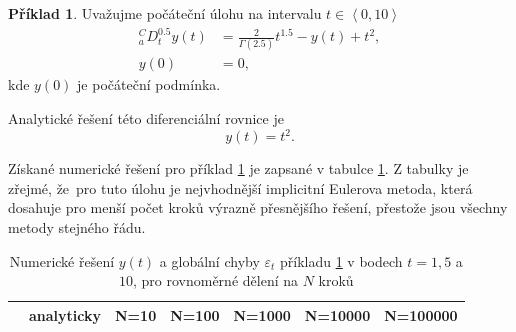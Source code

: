 \documentclass[a4paper,12pt,twoside]{article}
\theoremstyle{definition}
\newtheorem{prikl}[veta]{Příklad}
\theoremstyle{remark}
\numberwithin{equation}{section}
\numberwithin{table}{section}
\numberwithin{figure}{section}
\begin{document}
\begin{prikl}\label{TestovaciUloha1}
	Uvažujme počáteční úlohu na intervalu $ t \in \left\langle 0,10\right\rangle$
	\begin{equation}
		\begin{aligned}
			^{C}_{a}D_{t}^{0.5} y\left(t\right) &= \frac{2}{\Gamma\left(2.5\right)}t^{1.5} - y\left(t\right) + t^{2}, \\
			y\left(0\right) &= 0,
		\end{aligned} 
	\end{equation}
	kde $y\left(0\right)$ je počáteční podmínka. 

	Analytické řešení této diferenciální rovnice je \cite{LiYe}
	\begin{equation}
		y \left(t\right) = t^{2}.
	\end{equation}

	Získané numerické řešení pro příklad \ref{TestovaciUloha1} je zapsané v tabulce \ref{tab:tabulkaTestovacíÚloha(1)}. Z tabulky je zřejmé, že~pro tuto úlohu je nejvhodnější implicitní Eulerova metoda, která dosahuje pro menší počet kroků výrazně přesnějšího řešení, přestože jsou všechny metody stejného řádu.


	\begin{table}[h!]
	\centering
	\caption{Numerické řešení $y\left(t\right)$ a globální chyby $\varepsilon_{t}$ příkladu \ref{TestovaciUloha1} v bodech $t = 1, 5$ a $10$, pro rovnoměrné dělení na $N$ kroků}
	\label{tab:tabulkaTestovacíÚloha(1)}
	\begin{tabular}{|c||c|c|c|c|c|c|}
		\hline
		& analyticky & N=10 & N=100 & N=1000 & N=10000 & N=100000 \\
		\hline\hline
		

\end{tabular}
\end{table}
\end{prikl}
\end{document}
